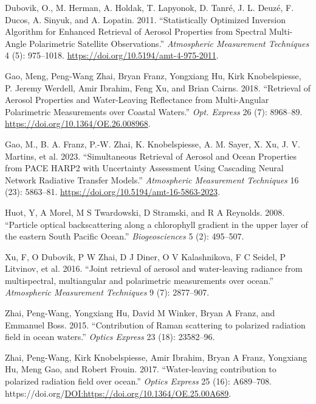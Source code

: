 \documentclass[
  letterpaper,
]{scrbook}
\newlength{\cslhangindent}
\newenvironment{CSLReferences}[2] %
 {\begin{list}{}{%
  \setlength{\itemindent}{0pt}
  \setlength{\leftmargin}{0pt}
  \setlength{\parsep}{0pt}
  \ifodd #1
   \setlength{\leftmargin}{\cslhangindent}
   \setlength{\itemindent}{-1\cslhangindent}
  \fi
  \setlength{\itemsep}{#2\baselineskip}}}
 {\end{list}}
\begin{document}
\label{refs}
\begin{CSLReferences}{1}{0}
Dubovik, O., M. Herman, A. Holdak, T. Lapyonok, D. Tanré, J. L. Deuzé,
F. Ducos, A. Sinyuk, and A. Lopatin. 2011. {``Statistically Optimized
Inversion Algorithm for Enhanced Retrieval of Aerosol Properties from
Spectral Multi-Angle Polarimetric Satellite Observations.''}
\emph{Atmospheric Measurement Techniques} 4 (5): 975--1018.
\url{https://doi.org/10.5194/amt-4-975-2011}.

Gao, Meng, Peng-Wang Zhai, Bryan Franz, Yongxiang Hu, Kirk
Knobelspiesse, P. Jeremy Werdell, Amir Ibrahim, Feng Xu, and Brian
Cairns. 2018. {``Retrieval of Aerosol Properties and Water-Leaving
Reflectance from Multi-Angular Polarimetric Measurements over Coastal
Waters.''} \emph{Opt. Express} 26 (7): 8968--89.
\url{https://doi.org/10.1364/OE.26.008968}.

Gao, M., B. A. Franz, P.-W. Zhai, K. Knobelspiesse, A. M. Sayer, X. Xu,
J. V. Martins, et al. 2023. {``Simultaneous Retrieval of Aerosol and
Ocean Properties from PACE HARP2 with Uncertainty Assessment Using
Cascading Neural Network Radiative Transfer Models.''} \emph{Atmospheric
Measurement Techniques} 16 (23): 5863--81.
\url{https://doi.org/10.5194/amt-16-5863-2023}.

Huot, Y, A Morel, M S Twardowski, D Stramski, and R A Reynolds. 2008.
{``{Particle optical backscattering along a chlorophyll gradient in the
upper layer of the eastern South Pacific Ocean}.''}
\emph{Biogeosciences} 5 (2): 495--507.

Xu, F, O Dubovik, P W Zhai, D J Diner, O V Kalashnikova, F C Seidel, P
Litvinov, et al. 2016. {``{Joint retrieval of aerosol and water-leaving
radiance from multispectral, multiangular and polarimetric measurements
over ocean}.''} \emph{Atmospheric Measurement Techniques} 9 (7):
2877--907.

Zhai, Peng-Wang, Yongxiang Hu, David M Winker, Bryan A Franz, and
Emmanuel Boss. 2015. {``{Contribution of Raman scattering to polarized
radiation field in ocean waters}.''} \emph{Optics Express} 23 (18):
23582--96.

Zhai, Peng-Wang, Kirk Knobelspiesse, Amir Ibrahim, Bryan A Franz,
Yongxiang Hu, Meng Gao, and Robert Frouin. 2017. {``{Water-leaving
contribution to polarized radiation field over ocean}.''} \emph{Optics
Express} 25 (16): A689--708.
https://doi.org/\url{DOI:https://doi.org/10.1364/OE.25.00A689}.

\end{CSLReferences}


\backmatter
\end{document}
